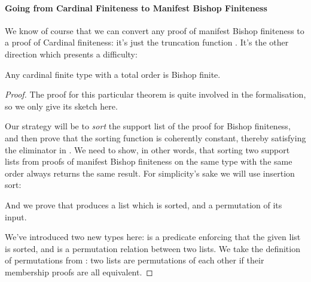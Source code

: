 \paragraph{Going from Cardinal Finiteness to Manifest Bishop Finiteness}
We know of course that we can convert any proof of manifest Bishop finiteness to
a proof of Cardinal finiteness: it's just the truncation function
\AgdaInductiveConstructor{\(\lvert \_ \rvert\)}.
It's the other direction which presents a difficulty:
\begin{theorem}\label{cardinal-to-manifest-bishop}
  Any cardinal finite type with a total order is Bishop finite.
\end{theorem}
\begin{proof}
The proof for this particular theorem is quite involved in the formalisation, so
we only give its sketch here.

Our strategy will be to \emph{sort} the support list of the proof for Bishop
finiteness, and then prove that the sorting function is coherently constant,
thereby satisfying the eliminator in .
We need to show, in other words, that sorting two support lists from proofs of
manifest Bishop finiteness on the same type with the same order always returns
the same result.
For simplicity's sake we will use insertion sort:

\begin{minipage}{\linewidth}
\begin{multicols}{2}
  
   \columnbreak \vfill \null \vfill
  
   \vfill \null
\end{multicols}
\end{minipage} \noindent
And we prove that  produces a list which is sorted, and a
permutation of its input.
\begin{multicols}{2}
  
   \columnbreak
  
  
\end{multicols} \vspace{-\baselineskip}
We've introduced two new types here:  is a predicate
enforcing that the given list is sorted, and
\AgdaFunction{\(\leftrightsquigarrow\)} is a permutation relation between two
lists.
We take the definition of permutations from
\citep{danielssonBagEquivalenceProofRelevant2012}: two lists are permutations of
each other if their membership proofs are all equivalent.


\end{proof}
